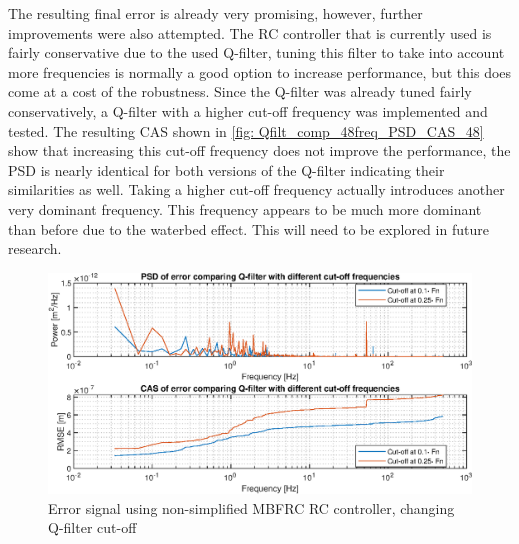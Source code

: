 \documentclass[journal]{IEEEtran}
\begin{document}
The resulting final error is already very promising, however, further improvements were also attempted. The RC controller that is currently used is fairly conservative due to the used Q-filter, tuning this filter to take into account more frequencies is normally a good option to increase performance, but this does come at a cost of the robustness. Since the Q-filter was already tuned fairly conservatively, a Q-filter with a higher cut-off frequency was implemented and tested. The resulting CAS shown in \autoref{fig: Qfilt_comp_48freq_PSD_CAS_48} show that increasing this cut-off frequency does not improve the performance, the PSD is nearly identical for both versions of the Q-filter indicating their similarities as well. Taking a higher cut-off frequency actually introduces another very dominant frequency. This frequency appears to be much more dominant than before due to the waterbed effect. This will need to be explored in future research.
\begin{figure}
    \centering
    \includegraphics[width=1\linewidth]{figures/Q-filter/comp_48freq_PSD_CAS_2.eps}
    \caption{Error signal using non-simplified MBFRC RC controller, changing Q-filter cut-off}
    \label{fig: Qfilt_comp_48freq_PSD_CAS_48}
\end{figure}
\end{document}
